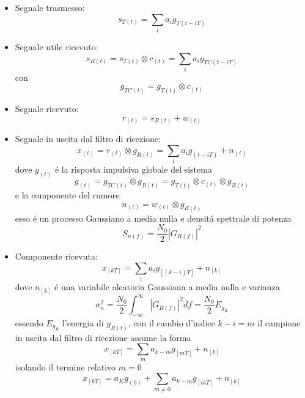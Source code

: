             \begin{itemize}
                \item {Segnale trasmesso:
                    \[
                        s_{T(t)} = \sum_{i}a_ig_{T(t-iT)}  
                    \]
                }
                \item {Segnale utile ricevuto:
                    \[
                        s_{R(t)} = s_{T(t)} \otimes c_{(t)} = \sum_{i}a_ig_{TC(t-iT)}  
                    \]
                    con 
                    \[
                        g_{TC(t)} = g_{T(t)} \otimes c_{(t)} 
                    \]
                }
                \item {Segnale ricevuto:
                    \[
                        r_{(t)} = s_{R(t)} + w_{(t)}  
                    \]
                }
                \item {Segnale in uscita dal filtro di ricezione:
                    \[
                        x_{(t)} = r_{(t)} \otimes g_{R(t)} = \sum_{i}a_ig_{(t-iT)}+n_{(t)}  
                    \]
                    dove $g_{(t)}$ é la risposta impulsiva globale del sistema
                    \[
                        g_{(t)} = g_{TC(t)} \otimes g_{R(t)} = g_{T(t)} \otimes c_{(t)} \otimes g_{R(t)}
                    \]
                    e la componente del rumore 
                    \[
                        n_{(t)} = w_{(t)} \otimes g_{R(t)}    
                    \]
                    esso é un processo Gaussiano a media nulla e densitá spettrale di potenza 
                    \[
                        S_{n(f)} = \frac{N_0}{2} \left|G_{R(f)}\right|^2  
                    \]
                }
                \item {Componente ricevuta:
                    \[
                        x_{[kT]} = \sum_{i}a_ig_{[(k-i)T]}+n_{[k]}  
                    \]
                    dove $n_{[k]}$ é una variabile aleatoria Gaussiana a media nulla e varianza 
                    \[
                        \sigma_n^2 = \frac{N_0}{2} \int_{-\infty}^{\infty}\left|G_{R(f)}\right|^2 df =\frac{N_0}{2} E_{g_R} 
                    \]
                    essendo $E_{g_R}$ l'energia di $g_{R(t)}$, con il cambio d'indice $k-i = m$ il campione in uscita dal filtro di ricezione
                    assume la forma 
                    \[
                        x_{[kT]} = \sum_{m}a_{k-m}g_{[mT]}+n_{[k]}
                    \]
                    isolando il termine relativo $m=0$
                    \[
                        x_{[kT]} = a_Kg_{(0)} + \sum_{m\neq 0}a_{k-m}g_{[mT]}+n_{[k]}      
\]}
\end{itemize}
